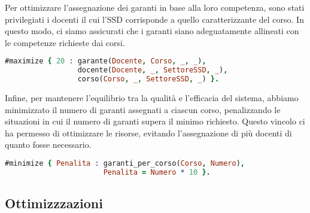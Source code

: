 Per ottimizzare l'assegnazione dei garanti in base alla loro competenza, sono stati 
privilegiati i docenti il cui l'SSD corrisponde a quello caratterizzante del corso.
In questo modo, ci siamo assicurati che i garanti siano adeguatamente allineati con 
le competenze richieste dai corsi.

\begin{lstlisting}[language=prolog, caption=Preferenza dei garanti con macrosettore coerente a quello del corso.]
% Ottimizzare i garanti con SSD caratterizzante
#maximize { 20 : garante(Docente, Corso, _, _), 
                 docente(Docente, _, SettoreSSD, _), 
                 corso(Corso, _, SettoreSSD, _) }.
\end{lstlisting}

Infine, per mantenere l'equilibrio tra la qualità e l'efficacia del sistema, abbiamo 
minimizzato il numero di garanti assegnati a ciascun corso, penalizzando le situazioni 
in cui il numero di garanti supera il minimo richiesto. Questo vincolo ci ha permesso 
di ottimizzare le risorse, evitando l'assegnazione di più docenti di quanto fosse necessario.

\begin{lstlisting}[language=prolog, caption=Minimizzazione dei garanti per corso di laurea.]
% Minimizzo il numero di garanti per ogni corso
#minimize { Penalita : garanti_per_corso(Corso, Numero),
                       Penalita = Numero * 10 }.
\end{lstlisting}

\subsection{Ottimizzzazioni}\label{sec:optimizations}